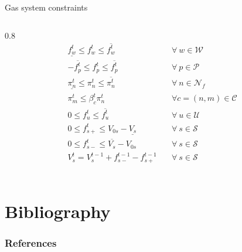 \documentclass[hyperref={colorlinks,citecolor=blue,linkcolor=blue,urlcolor=blue}]{beamer}
\begin{document}
\begin{frame}{Gas system constraints}
\begin{columns}
\begin{column}{0.8\textwidth}
 \begin{subequations}
\begin{alignat}{4}
    \underline{f_{w}^t} \leq f_{w}^t \leq \overline{f_{w}^t} &\quad \forall \ w \in \mathcal{W} \label{eq:well_limits} \\
    -\overline{f_{p}^t} \leq f_{p}^t \leq \overline{f_{p}^t} &\quad \forall \ p \in \mathcal{P} \label{eq:pipe_limits} \\
    \underline{\pi_{n}^t} \leq \pi_{n}^t \leq \overline{\pi_{n}^t} &\quad \forall \ n \in \mathcal{N}_f \label{eq:press_limit} \\
    \pi_{m}^t \leq \beta_{c}^t{\pi_{n}^t} &\quad \forall c=(n,m) \in \mathcal{C} \label{eq:comp_ratio} \\
    0 \leq f_{u}^{t} \leq \overline{f_{u}^{t}} &\quad \forall \ u \in \mathcal{U} \label{eq:dem_limit_gas} \\
    0 \leq f_{s+}^t \leq V_{0s} - \underline{V_s} &\quad \forall \ s \in \mathcal{S} \label{eq:sto_limit1} \\ 
    0 \leq f_{s-}^t \leq \overline{V_s} - V_{0s} &\quad \forall \ s \in \mathcal{S} \label{eq:sto_limit2} \\ 
    V_{s}^t = V_{s}^{t-1} + f_{s-}^{t-1} - f_{s+}^{t-1} &\quad \forall \ s \in \mathcal{S} \label{eq:sto_time}\\
\end{alignat}
\end{subequations}
\end{column}
\end{columns}
\end{frame}






\section{Bibliography}
\begin{frame}[allowframebreaks]
        \frametitle{References}
        
        
\end{frame}
\end{document}
